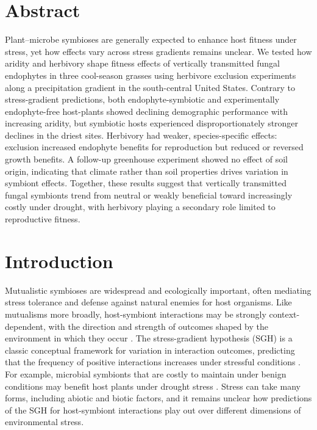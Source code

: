 \documentclass[12pt]{article}\usepackage[]{graphicx}\usepackage[dvipsnames]{xcolor}
\begin{document}
\section*{Abstract}
Plant–microbe symbioses are generally expected to enhance host fitness under stress, yet how effects vary across stress gradients remains unclear. 
We tested how aridity and herbivory shape fitness effects of vertically transmitted fungal endophytes in three cool-season grasses using herbivore exclusion experiments along a precipitation gradient in the south-central United States. 
Contrary to stress-gradient predictions, both endophyte-symbiotic and experimentally endophyte-free host-plants  showed declining demographic performance with increasing aridity, but symbiotic hosts experienced disproportionately stronger declines in the driest sites. 
Herbivory had weaker, species-specific effects: exclusion increased endophyte benefits for reproduction but reduced or reversed growth benefits. 
A follow-up  greenhouse experiment showed no effect of soil origin, indicating that climate rather than soil properties drives variation in symbiont effects. 
Together, these results suggest that vertically transmitted fungal symbionts trend from neutral or weakly beneficial toward increasingly costly under drought, with herbivory playing a secondary role limited to reproductive fitness.

\newpage
\section*{Introduction}
Mutualistic symbioses are widespread and ecologically important, often mediating stress tolerance and defense against natural enemies for host organisms. 
Like mutualisms more broadly, host-symbiont interactions may be strongly context-dependent, with the direction and strength of outcomes shaped by the environment in which they occur \citep{hoeksema2015context, bronstein1994conditional,hoang2024impacts,rudgers2020climate}. 
The stress-gradient hypothesis (SGH) is a classic conceptual framework for variation in interaction outcomes, predicting that the frequency of positive interactions increases under stressful conditions \citep{louthan2015and,bertness1994positive,holmgren2010strong,maestre2009refining}.
For example, microbial symbionts that are costly to maintain under benign conditions may benefit host plants under drought stress  \citep{giauque2019endophyte}. 
Stress can take many forms, including abiotic and biotic factors, and it remains unclear how predictions of the SGH for host-symbiont interactions play out over different dimensions of environmental stress. 
\end{document}
